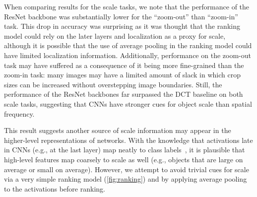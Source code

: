 When comparing results for the scale tasks, we note that the performance of the ResNet backbone was substantially lower for the ``zoom-out'' than ``zoom-in'' task.
This drop in accuracy was surprising as it was thought that the ranking model could rely on the later layers and localization as a proxy for scale, although it is possible that the use of average pooling in the ranking model could have limited localization information.
Additionally, performance on the zoom-out task may have suffered as a consequence of it being more fine-grained than the zoom-in task: many images may have a limited amount of slack in which crop sizes can be increased without overstepping image boundaries.
Still, the performance of the ResNet backbones far surpassed the DCT baseline on both scale tasks, suggesting that CNNs have stronger cues for object scale than spatial frequency.

This result suggests another source of scale information may appear in the higher-level representations of networks.
With the knowledge that activations late in CNNs (e.g., at the last layer) map neatly to class labels~\cite{Zhou_2016_CVPR}, it is plausible that high-level features map coarsely to scale as well (e.g., objects that are large on average or small on average).
However, we attempt to avoid trivial cues for scale via a very simple ranking model (\autoref{fig:ranking}) and by applying average pooling to the activations before ranking.



